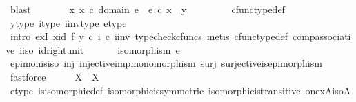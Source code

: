 \begin{isabellebody}
\ blast\isanewline
\ \ \ \ \isamarkupfalse%
\ \isamarkupfalse%
\ {\isachardoublequoteopen}{\isasymexists}x{\isachardot}{\kern0pt}\ x\ {\isasymin}\isactrlsub c\ domain\ e\ {\isasymand}\ e\ {\isasymcirc}\isactrlsub c\ x\ {\isacharequal}{\kern0pt}\ y{\isachardoublequoteclose}\ \isanewline
\ \ \ \ \ \ \isamarkupfalse%
\ cfunc{\isacharunderscore}{\kern0pt}type{\isacharunderscore}{\kern0pt}def\ \isamarkupfalse%
\ y{\isacharunderscore}{\kern0pt}type\ i{\isacharunderscore}{\kern0pt}type\ i{\isacharunderscore}{\kern0pt}inv{\isacharunderscore}{\kern0pt}type\ e{\isacharunderscore}{\kern0pt}type\ \isanewline
\ \ \ \ \ \ \isamarkupfalse%
\ {\isacharparenleft}{\kern0pt}intro\ exI{\isacharbrackleft}{\kern0pt}\ x{\isacharequal}{\kern0pt}{\isachardoublequoteopen}{\isacharparenleft}{\kern0pt}id{\isacharparenleft}{\kern0pt}{\isasymone}{\isacharparenright}{\kern0pt}\ {\isasymtimes}\isactrlsub f\ {\isacharparenleft}{\kern0pt}y\ {\isasymcirc}\isactrlsub c\ i{\isacharparenright}{\kern0pt}\isactrlsup {\isasymsharp}{\isacharparenright}{\kern0pt}\ {\isasymcirc}\isactrlsub c\ i{\isacharunderscore}{\kern0pt}inv{\isachardoublequoteclose}{\isacharbrackright}{\kern0pt}{\isacharcomma}{\kern0pt}\ typecheck{\isacharunderscore}{\kern0pt}cfuncs{\isacharcomma}{\kern0pt}\ metis\ cfunc{\isacharunderscore}{\kern0pt}type{\isacharunderscore}{\kern0pt}def\ comp{\isacharunderscore}{\kern0pt}associative\ i{\isacharunderscore}{\kern0pt}iso\ id{\isacharunderscore}{\kern0pt}right{\isacharunderscore}{\kern0pt}unit{}{\isacharparenright}{\kern0pt}\isanewline
\ \ \isamarkupfalse%
\isanewline
\isanewline
\ \ \isamarkupfalse%
\ {\isachardoublequoteopen}isomorphism\ e{\isachardoublequoteclose}\isanewline
\ \ \ \ \isamarkupfalse%
\ epi{\isacharunderscore}{\kern0pt}mon{\isacharunderscore}{\kern0pt}is{\isacharunderscore}{\kern0pt}iso\ inj\ injective{\isacharunderscore}{\kern0pt}imp{\isacharunderscore}{\kern0pt}monomorphism\ surj\ surjective{\isacharunderscore}{\kern0pt}is{\isacharunderscore}{\kern0pt}epimorphism\ \isamarkupfalse%
\ fastforce\isanewline
\ \ \isamarkupfalse%
\ \isamarkupfalse%
\ {\isachardoublequoteopen}X\isactrlbsup {\isasymone}\isactrlesup \ {\isasymcong}\ X{\isachardoublequoteclose}\isanewline
\ \ \ \ \isamarkupfalse%
\ e{\isacharunderscore}{\kern0pt}type\ is{\isacharunderscore}{\kern0pt}isomorphic{\isacharunderscore}{\kern0pt}def\ isomorphic{\isacharunderscore}{\kern0pt}is{\isacharunderscore}{\kern0pt}symmetric\ isomorphic{\isacharunderscore}{\kern0pt}is{\isacharunderscore}{\kern0pt}transitive\ one{\isacharunderscore}{\kern0pt}x{\isacharunderscore}{\kern0pt}A{\isacharunderscore}{\kern0pt}iso{\isacharunderscore}{\kern0pt}A\ \isamarkupfalse%

\end{isabellebody}
